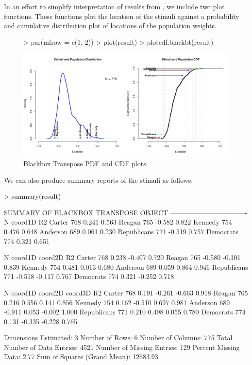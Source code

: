 \documentclass[nojss]{jss}
\begin{document}
In an effort to simplify interpretation of results from , we include two plot functions.
These functions plot the location of the stimuli against a probability and cumulative distribution plot of
locations of the population weights.

\begin{figure}
\begin{center}
\begin{Schunk}
\begin{Sinput}
> par(mfrow = c(1, 2))
> plot(result)
> plotcdf.blackbt(result)
\end{Sinput}
\end{Schunk}
\includegraphics{basicspace-bbt}
\end{center}
\caption{Blackbox Transpose PDF and CDF plots.}
\label{fig:bbt}
\end{figure}

We can also produce summary reports of the stimuli as follows:

\begin{Schunk}
\begin{Sinput}
> summary(result)
\end{Sinput}
\begin{Soutput}
SUMMARY OF BLACKBOX TRANSPOSE OBJECT
----------------------------------
              N coord1D    R2
Carter      768   0.241 0.563
Reagan      765  -0.582 0.822
Kennedy     754   0.476 0.648
Anderson    689   0.061 0.230
Republicans 771  -0.519 0.757
Democrats   774   0.321 0.651

              N coord1D coord2D    R2
Carter      768   0.238  -0.407 0.720
Reagan      765  -0.580  -0.101 0.839
Kennedy     754   0.481   0.013 0.680
Anderson    689   0.059   0.864 0.946
Republicans 771  -0.518  -0.117 0.767
Democrats   774   0.321  -0.252 0.718

              N coord1D coord2D coord3D    R2
Carter      768   0.191  -0.261  -0.663 0.918
Reagan      765   0.216   0.556   0.141 0.856
Kennedy     754   0.162  -0.510   0.697 0.981
Anderson    689  -0.911   0.053  -0.002 1.000
Republicans 771   0.210   0.498   0.055 0.780
Democrats   774   0.131  -0.335  -0.228 0.765

	Dimensions Estimated: 3
	Number of Rows: 6
	Number of Columns: 775
	Total Number of Data Entries: 4521
	Number of Missing Entries: 129
	Percent Missing Data: 2.77%
	Sum of Squares (Grand Mean): 12683.93
\end{Soutput}
\end{Schunk}
\end{document}
